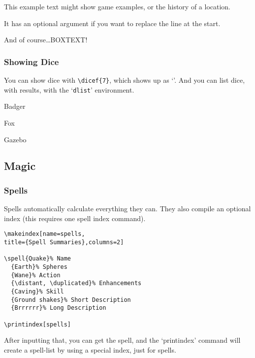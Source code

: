 \documentclass[a4paper,openany]{book}
\begin{document}
\begin{multicols}{2}
\begin{exampletext}
  This example text might show game examples, or the history of a location.

  It has an optional argument if you want to replace the line at the start.

\end{exampletext}

\begin{boxtext}
  And of course\ldots BOXTEXT!

\end{boxtext}

\subsubsection{Showing Dice}

You can show dice with \verb"\dicef{7}", which shows up as `'.
And you can list dice, with results, with the `\texttt{dlist}' environment.

\begin{dlist}
  \item Badger
  \item Fox
  \item Gazebo
\end{dlist}

\subsection{Magic}

\subsubsection{Spells}

Spells automatically calculate everything they can.
They also compile an optional index (this requires one spell index command).

\begin{verbatim}
\makeindex[name=spells,
title={Spell Summaries},columns=2]

\spell{Quake}% Name
  {Earth}% Spheres
  {Wane}% Action
  {\distant, \duplicated}% Enhancements
  {Caving}% Skill
  {Ground shakes}% Short Description
  {Brrrrrr}% Long Description

\printindex[spells]
\end{verbatim}

After inputting that, you can get the spell, and the `printindex' command will create a spell-list by using a special index, just for spells.


\end{multicols}
\end{document}
